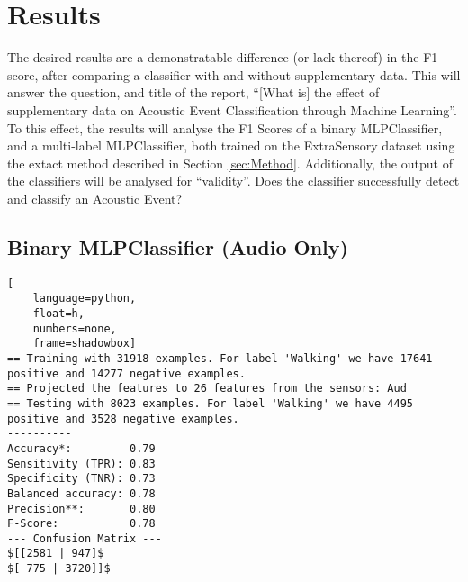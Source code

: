 \documentclass{UoNMCHA}
\newcommand{\inlineQuote}[1]{``#1''}
\numberwithin{equation}{section}
\begin{document}



\section{Results}

The desired results are a demonstratable difference (or lack thereof) in the F1 score, after comparing a classifier with and without supplementary data.
This will answer the question, and title of the report, \inlineQuote{[What is] the  effect of supplementary data on Acoustic Event Classification through Machine Learning}. To this effect, the results will analyse the F1 Scores of a binary MLPClassifier, and a multi-label MLPClassifier, both trained on the ExtraSensory dataset using the extact method described in Section \ref{sec:Method}.
Additionally, the output of the classifiers will be analysed for \inlineQuote{validity}. Does the classifier successfully detect and classify an Acoustic Event?


\subsection{Binary MLPClassifier (Audio Only)}

\begin{lstlisting}[
    language=python,
    float=h,
    numbers=none,
    frame=shadowbox]
== Training with 31918 examples. For label 'Walking' we have 17641 positive and 14277 negative examples.
== Projected the features to 26 features from the sensors: Aud
== Testing with 8023 examples. For label 'Walking' we have 4495 positive and 3528 negative examples.
----------
Accuracy*:         0.79
Sensitivity (TPR): 0.83
Specificity (TNR): 0.73
Balanced accuracy: 0.78
Precision**:       0.80
F-Score:           0.78
--- Confusion Matrix ---
$[[2581 | 947]$
$[ 775 | 3720]]$
\end{lstlisting}
\end{document}
